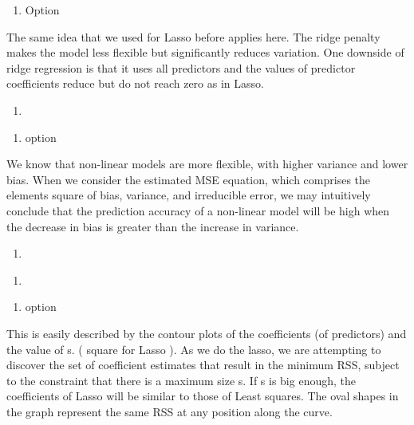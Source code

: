 \documentclass[
]{article}
\providecommand{\tightlist}{%
  \setlength{\itemsep}{0pt}\setlength{\parskip}{0pt}}
\begin{document}
\begin{enumerate}
\def\labelenumi{(\roman{enumi})}
\setcounter{enumi}{2}
\tightlist
\item
  Option
\end{enumerate}

The same idea that we used for Lasso before applies here. The ridge
penalty makes the model less flexible but significantly reduces
variation. One downside of ridge regression is that it uses all
predictors and the values of predictor coefficients reduce but do not
reach zero as in Lasso.

\begin{enumerate}
\def\labelenumi{\alph{enumi})}
\setcounter{enumi}{2}
\tightlist
\item
\end{enumerate}

\begin{enumerate}
\def\labelenumi{(\roman{enumi})}
\setcounter{enumi}{1}
\tightlist
\item
  option
\end{enumerate}

We know that non-linear models are more flexible, with higher variance
and lower bias. When we consider the estimated MSE equation, which
comprises the elements square of bias, variance, and irreducible error,
we may intuitively conclude that the prediction accuracy of a non-linear
model will be high when the decrease in bias is greater than the
increase in variance.

\begin{enumerate}
\def\labelenumi{\arabic{enumi})}
\setcounter{enumi}{2}
\tightlist
\item
\end{enumerate}

\begin{enumerate}
\def\labelenumi{\alph{enumi})}
\tightlist
\item
\end{enumerate}

\begin{enumerate}
\def\labelenumi{(\roman{enumi})}
\setcounter{enumi}{3}
\tightlist
\item
  option
\end{enumerate}

This is easily described by the contour plots of the coefficients (of
predictors) and the value of s. ( square for Lasso ). As we do the
lasso, we are attempting to discover the set of coefficient estimates
that result in the minimum RSS, subject to the constraint that there is
a maximum size s. If s is big enough, the coefficients of Lasso will be
similar to those of Least squares. The oval shapes in the graph
represent the same RSS at any position along the curve.
\end{document}

